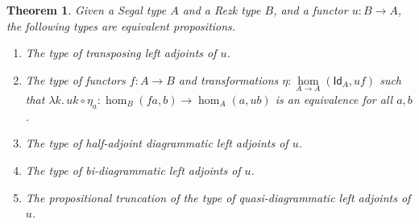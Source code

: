\documentclass{amsart}
\theoremstyle{plain}
\newtheorem{thm}{Theorem}[section]
\theoremstyle{definition}
\theoremstyle{remark}
\numberwithin{equation}{section}
\def\nat#1#2{\underset{#1\to#2}{\hom}}
\newcommand{\lam}[1]{\lambda #1.\,}
\newcommand{\idfunc}[1]{\mathsf{Id}_{#1}}
\begin{document}
\begin{thm}\label{thm:rezk-adj-prop}
  Given a Segal type $A$ and a Rezk type $B$, and a functor $u:B\to A$, the following types are equivalent propositions.
  \begin{enumerate}[label=(\roman*)]
  \item The type of transposing left adjoints of $u$.\label{item:rap1}
  \item The type of functors $f:A\to B$ and transformations $\eta:\nat AA (\idfunc A,uf)$ such that $\lam{k} u k \circ \eta_a : \hom_B(fa,b) \to \hom_A(a,ub) $ is an equivalence for all $a,b$.\label{item:rap1a}
  \item The type of half-adjoint diagrammatic left adjoints of $u$.\label{item:rap2}
  \item The type of bi-diagrammatic left adjoints of $u$.\label{item:rap3}
  \item The propositional truncation of the type of quasi-diagrammatic left adjoints of $u$.\label{item:rap4}
  \end{enumerate}
\end{thm}
\end{document}

